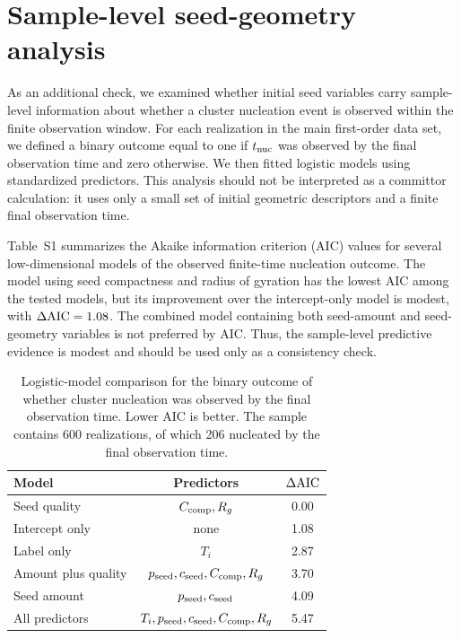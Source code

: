 ﻿\documentclass[aps,pre,preprint,floatfix,amsmath,amssymb,superscriptaddress]{revtex4-2}
\begin{document}
\clearpage

\section*{Sample-level seed-geometry analysis}

As an additional check, we examined whether initial seed variables carry sample-level information about whether a cluster nucleation event is observed within the finite observation window. For each realization in the main first-order data set, we defined a binary outcome equal to one if $t_{\rm nuc}$ was observed by the final observation time and zero otherwise. We then fitted logistic models using standardized predictors. This analysis should not be interpreted as a committor calculation: it uses only a small set of initial geometric descriptors and a finite final observation time.

Table~S1 summarizes the Akaike information criterion (AIC) values for several low-dimensional models of the observed finite-time nucleation outcome. The model using seed compactness and radius of gyration has the lowest AIC among the tested models, but its improvement over the intercept-only model is modest, with $\Delta{\rm AIC}=1.08$. The combined model containing both seed-amount and seed-geometry variables is not preferred by AIC. Thus, the sample-level predictive evidence is modest and should be used only as a consistency check.

\begin{table}[t]
\centering
\caption{Logistic-model comparison for the binary outcome of whether cluster nucleation was observed by the final observation time. Lower AIC is better. The sample contains 600 realizations, of which 206 nucleated by the final observation time.}
\label{tab:S1-logistic-aic}
\begin{tabular}{lcc}
\hline
Model & Predictors & $\Delta{\rm AIC}$ \\
\hline
Seed quality & $C_{\rm comp}, R_g$ & 0.00 \\
Intercept only & none & 1.08 \\
Label only & $T_i$ & 2.87 \\
Amount plus quality & $p_{\rm seed}, c_{\rm seed}, C_{\rm comp}, R_g$ & 3.70 \\
Seed amount & $p_{\rm seed}, c_{\rm seed}$ & 4.09 \\
All predictors & $T_i, p_{\rm seed}, c_{\rm seed}, C_{\rm comp}, R_g$ & 5.47 \\
\hline
\end{tabular}
\end{table}
\end{document}
